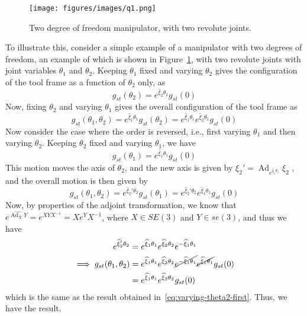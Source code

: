 \newpage
\begin{figure}[htb]
    \centering
    \texttt{[image: figures/images/q1.png]}
    \caption{
        Two degree of freedom manipulator, with two revolute joints.
    }\label{fig:2dof-manipulator}
\end{figure}

To illustrate this, consider a simple example of a manipulator with two degrees of freedom, an example of which is shown in Figure~\ref{fig:2dof-manipulator}, with two revolute joints with joint variables \( \theta_1 \) and \( \theta_2 \).
Keeping \( \theta_1 \) fixed and varying \( \theta_2 \) gives the configuration of the tool frame as a function of \( \theta_2 \) only, as
\begin{equation*}
    g_{st}(\theta_2)
    =
    e^{\widehat{\xi}_2 \theta_2}
    g_{st}(0)
\end{equation*}
Now, fixing \( \theta_2 \) and varying \( \theta_1 \) gives the overall configuration of the tool frame as
\begin{equation}\label{eq:varying-theta2-first}
    g_{st}(\theta_1, \theta_2)
    =
    e^{\widehat{\xi}_1 \theta_1}
    g_{st}(\theta_2)
    =
    e^{\widehat{\xi}_1 \theta_1}
    e^{\widehat{\xi}_2 \theta_2}
    g_{st}(0)
\end{equation}
Now consider the case where the order is reversed, i.e., first varying \( \theta_1 \) and then varying \( \theta_2 \).
Keeping \( \theta_2 \) fixed and varying \( \theta_1 \), we have
\begin{equation*}
    g_{st}(\theta_1)
    =
    e^{\widehat{\xi}_1 \theta_1}
    g_{st}(0)
\end{equation*}
This motion moves the axis of \( \theta_2 \), and the new axis is given by
\(
\displaystyle
\xi_2'
=
\operatorname{Ad}_{e^{\widehat{\xi}_1 \theta_1}} \xi_2
\)
, and the overall motion is then given by
\begin{equation*}
    g_{st}(\theta_1, \theta_2)
    =
    e^{\widehat{\xi}_2' \theta_2}
    g_{st}(\theta_1)
    =
    e^{\widehat{\xi}_2' \theta_2}
    e^{\widehat{\xi}_1 \theta_1}
    g_{st}(0)
\end{equation*}
Now, by properties of the adjoint transformation, we know that \( e^{\widehat{\operatorname{Ad}_X Y}} = e^{X Y X^{-1}} = X e^{Y} X^{-1} \), where \( X \in SE (3) \) and \( Y \in se (3) \), and thus we have
\begin{align*}
    e^{\widehat{\xi}_2' \theta_2}
     & =
    e^{\widehat{\xi}_1 \theta_1}
    e^{\widehat{\xi}_2 \theta_2}
    e^{-\widehat{\xi}_1 \theta_1}
    \\
    \implies
    g_{st}(\theta_1, \theta_2)
     & =
    e^{\widehat{\xi}_1 \theta_1}
    e^{\widehat{\xi}_2 \theta_2}
    \cancel{e^{-\widehat{\xi}_1 \theta_1}}
    \cancel{e^{\widehat{\xi}_1 \theta_1}}
    g_{st}(0)
    \nonumber
    \\ & =
    e^{\widehat{\xi}_1 \theta_1}
    e^{\widehat{\xi}_2 \theta_2}
    g_{st}(0)
\end{align*}
which is the same as the result obtained in~\eqref{eq:varying-theta2-first}.
Thus, we have the result.
